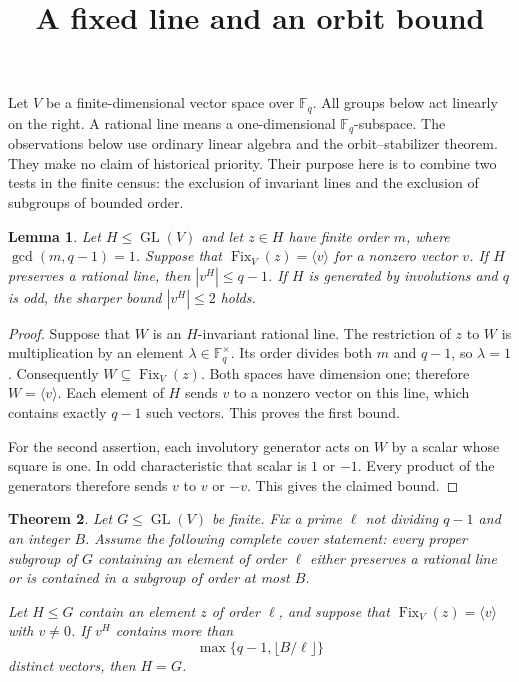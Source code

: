 \documentclass[11pt]{article}
\newtheorem{lemma}{Lemma}
\newtheorem{theorem}[lemma]{Theorem}
\begin{document}
\title{A fixed line and an orbit bound}
\author{}
\date{}
\maketitle

Let $V$ be a finite-dimensional vector space over $\mathbb F_q$.
All groups below act linearly on the right. A rational line means a
one-dimensional $\mathbb F_q$-subspace. The observations below use ordinary
linear algebra and the orbit--stabilizer theorem. They make no claim of
historical priority. Their purpose here is to combine two tests in the
finite census: the exclusion of invariant lines and the exclusion of
subgroups of bounded order.

\begin{lemma}\label{lem:line}
Let $H\leq \operatorname{GL}(V)$ and let $z\in H$ have finite order $m$,
where $\gcd(m,q-1)=1$. Suppose that
$\operatorname{Fix}_V(z)=\langle v\rangle$ for a nonzero vector $v$.
If $H$ preserves a rational line, then $|v^H|\leq q-1$.
If $H$ is generated by involutions and $q$ is odd, the sharper bound
$|v^H|\leq 2$ holds.
\end{lemma}

\begin{proof}
Suppose that $W$ is an $H$-invariant rational line. The restriction of
$z$ to $W$ is multiplication by an element $\lambda\in\mathbb F_q^\times$.
Its order divides both $m$ and $q-1$, so $\lambda=1$. Consequently
$W\subseteq\operatorname{Fix}_V(z)$. Both spaces have dimension one;
therefore $W=\langle v\rangle$. Each element of $H$ sends $v$ to a
nonzero vector on this line, which contains exactly $q-1$ such vectors.
This proves the first bound.

For the second assertion, each involutory generator acts on $W$ by a
scalar whose square is one. In odd characteristic that scalar is $1$ or
$-1$. Every product of the generators therefore sends $v$ to $v$ or
$-v$. This gives the claimed bound.
\end{proof}

\begin{theorem}\label{thm:cover}
Let $G\leq\operatorname{GL}(V)$ be finite. Fix a prime $\ell$ not dividing
$q-1$ and an integer $B$. Assume the following complete cover statement:
every proper subgroup of $G$ containing an element of order $\ell$ either
preserves a rational line or is contained in a subgroup of order at most
$B$.

Let $H\leq G$ contain an element $z$ of order $\ell$, and suppose that
$\operatorname{Fix}_V(z)=\langle v\rangle$ with $v\ne0$. If $v^H$ contains
more than
\[
 \max\{q-1,\lfloor B/\ell\rfloor\}
\]
distinct vectors, then $H=G$.
\end{theorem}
\end{document}
